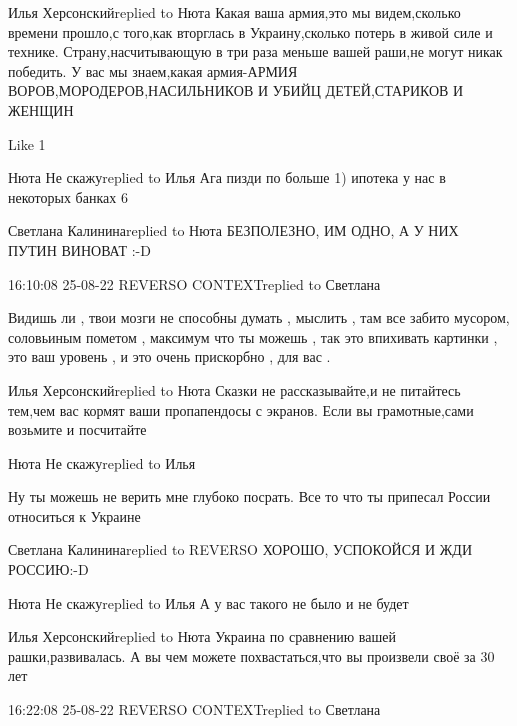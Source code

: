  
 
 
 
 

Илья Херсонскийreplied to Нюта
Какая ваша армия,это мы видем,сколько времени прошло,с того,как вторглась  в Украину,сколько потерь в живой силе и технике. Страну,насчитывающую в три раза меньше вашей раши,не могут никак победить. У вас мы знаем,какая армия-АРМИЯ ВОРОВ,МОРОДЕРОВ,НАСИЛЬНИКОВ И УБИЙЦ ДЕТЕЙ,СТАРИКОВ И ЖЕНЩИН

    Like 1

Нюта Не скажуreplied to Илья
Ага пизди по больше 1) ипотека у нас в некоторых банках 6%

Светлана Калининаreplied to Нюта
БЕЗПОЛЕЗНО, ИМ ОДНО, А У НИХ ПУТИН ВИНОВАТ :-D

16:10:08 25-08-22
REVERSO CONTEXTreplied to Светлана

Видишь ли , твои мозги не способны думать , мыслить , там все забито мусором,
соловьиным пометом , максимум что ты можешь , так это впихивать картинки , это
ваш уровень , и это очень прискорбно , для вас .

Илья Херсонскийreplied to Нюта
Сказки не рассказывайте,и не питайтесь тем,чем вас кормят ваши пропапендосы с экранов. Если вы грамотные,сами возьмите и посчитайте

Нюта Не скажуreplied to Илья

Ну ты можешь не верить мне глубоко посрать. Все то что ты припесал России
относиться к Украине

Светлана Калининаreplied to REVERSO
ХОРОШО, УСПОКОЙСЯ И ЖДИ РОССИЮ:-D

Нюта Не скажуreplied to Илья
А у вас такого не было и не будет

Илья Херсонскийreplied to Нюта
Украина по сравнению вашей рашки,развивалась. А вы чем можете похвастаться,что вы произвели своё за 30 лет

16:22:08 25-08-22
REVERSO CONTEXTreplied to Светлана


